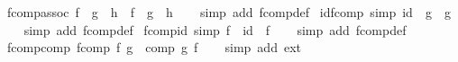 \begin{isabellebody}
%
\isadelimproof
\isanewline
%
\endisadelimproof
\isanewline
{}\isamarkupfalse%
\ fcomp{\isacharunderscore}{\kern0pt}assoc{\isacharcolon}{\kern0pt}\ {\isachardoublequoteopen}{\isacharparenleft}{\kern0pt}f\ {\isasymcirc}{\isachargreater}{\kern0pt}\ g{\isacharparenright}{\kern0pt}\ {\isasymcirc}{\isachargreater}{\kern0pt}\ h\ {\isacharequal}{\kern0pt}\ f\ {\isasymcirc}{\isachargreater}{\kern0pt}\ {\isacharparenleft}{\kern0pt}g\ {\isasymcirc}{\isachargreater}{\kern0pt}\ h{\isacharparenright}{\kern0pt}{\isachardoublequoteclose}\isanewline
%
\isadelimproof
\ \ %
\endisadelimproof
%
\isatagproof
{}\isamarkupfalse%
\ {\isacharparenleft}{\kern0pt}simp\ add{\isacharcolon}{\kern0pt}\ fcomp{\isacharunderscore}{\kern0pt}def{\isacharparenright}{\kern0pt}%
\endisatagproof
{\isafoldproof}%
%
\isadelimproof
\isanewline
%
\endisadelimproof
\isanewline
{}\isamarkupfalse%
\ id{\isacharunderscore}{\kern0pt}fcomp\ {\isacharbrackleft}{\kern0pt}simp{\isacharbrackright}{\kern0pt}{\isacharcolon}{\kern0pt}\ {\isachardoublequoteopen}id\ {\isasymcirc}{\isachargreater}{\kern0pt}\ g\ {\isacharequal}{\kern0pt}\ g{\isachardoublequoteclose}\isanewline
%
\isadelimproof
\ \ %
\endisadelimproof
%
\isatagproof
{}\isamarkupfalse%
\ {\isacharparenleft}{\kern0pt}simp\ add{\isacharcolon}{\kern0pt}\ fcomp{\isacharunderscore}{\kern0pt}def{\isacharparenright}{\kern0pt}%
\endisatagproof
{\isafoldproof}%
%
\isadelimproof
\isanewline
%
\endisadelimproof
\isanewline
{}\isamarkupfalse%
\ fcomp{\isacharunderscore}{\kern0pt}id\ {\isacharbrackleft}{\kern0pt}simp{\isacharbrackright}{\kern0pt}{\isacharcolon}{\kern0pt}\ {\isachardoublequoteopen}f\ {\isasymcirc}{\isachargreater}{\kern0pt}\ id\ {\isacharequal}{\kern0pt}\ f{\isachardoublequoteclose}\isanewline
%
\isadelimproof
\ \ %
\endisadelimproof
%
\isatagproof
{}\isamarkupfalse%
\ {\isacharparenleft}{\kern0pt}simp\ add{\isacharcolon}{\kern0pt}\ fcomp{\isacharunderscore}{\kern0pt}def{\isacharparenright}{\kern0pt}%
\endisatagproof
{\isafoldproof}%
%
\isadelimproof
\isanewline
%
\endisadelimproof
\isanewline
{}\isamarkupfalse%
\ fcomp{\isacharunderscore}{\kern0pt}comp{\isacharcolon}{\kern0pt}\ {\isachardoublequoteopen}fcomp\ f\ g\ {\isacharequal}{\kern0pt}\ comp\ g\ f{\isachardoublequoteclose}\isanewline
%
\isadelimproof
\ \ %
\endisadelimproof
%
\isatagproof
{}\isamarkupfalse%
\ {\isacharparenleft}{\kern0pt}simp\ add{\isacharcolon}{\kern0pt}\ ext{\isacharparenright}{\kern0pt}%
\endisatagproof
{\isafoldproof}%
%
\isadelimproof
\isanewline
%
\endisadelimproof

\end{isabellebody}
